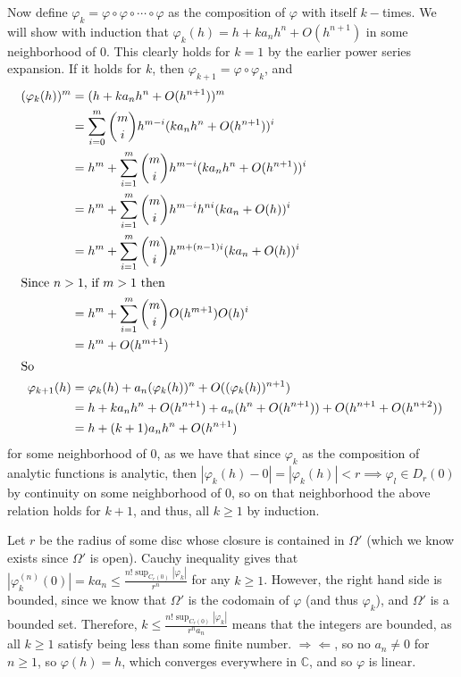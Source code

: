 \documentclass[12pt,letterpaper]{article}
\theoremstyle{definition}
\newcommand{\contra}{\Rightarrow\!\Leftarrow}
\newcommand{\C}{\mathbb{C}}
\begin{document}
Now define $\varphi_{k} = \varphi \circ \varphi \circ \cdots \circ \varphi$ as the composition of $\varphi$ with itself $k-$times. We will show with induction that $\varphi_{k}(h) = h + ka_{n}h^{n} + O(h^{n+1})$ in some neighborhood of $0$. This clearly holds for $k = 1$ by the earlier power series expansion. If it holds for $k$, then $\varphi_{k+1} = \varphi \circ \varphi_{k}$, and
\begin{align*}
  (\varphi_{k}(h))^{m} &= (h + ka_nh^n+O(h^{n+1}))^m \\
                   &= \sum_{i=0}^{m}\binom{m}{i}h^{m-i}(ka_{n}h^{n} + O(h^{n+1}))^{i} \\
                   &= h^{m} + \sum_{i=1}^{m}\binom{m}{i}h^{m-i}(ka_{n}h^{n} + O(h^{n+1}))^{i} \\
                   &= h^{m} + \sum_{i=1}^{m}\binom{m}{i}h^{m-i}h^{ni}(ka_{n}+ O(h))^{i} \\
                   &= h^{m} + \sum_{i=1}^{m}\binom{m}{i}h^{m + (n-1)i}(ka_{n}+ O(h))^{i} \\
  \intertext{Since $n > 1$, if $m > 1$ then}
                   &= h^{m} + \sum_{i=1}^{m}\binom{m}{i}O(h^{m + 1})O(h)^{i} \\
                   &= h^{m} + O(h^{m+1}) \\
  \intertext{So}
  \varphi_{k+1}(h) &= \varphi_{k}(h) + a_{n}(\varphi_{k}(h))^{n} + O((\varphi_{k}(h))^{n+1}) \\
              &= h + ka_{n}h^{n} + O(h^{n+1}) + a_{n}(h^{n} + O(h^{n+1})) + O(h^{n+1} + O(h^{n+2})) \\
              &= h + (k+1)a_{n}h^{n} + O(h^{n+1})
\end{align*}
for some neighborhood of $0$, as we have that since $\varphi_{k}$ as the composition of analytic functions is analytic, then $|\varphi_{k}(h) - 0|  = |\varphi_{k}(h)| < r \implies \varphi_{l} \in D_{r}(0)$ by continuity on some neighborhood of 0, so on that neighborhood the above relation holds for $k + 1$, and thus, all $k \geq 1$ by induction.

Let $r$ be the radius of some disc whose closure is contained in $\Omega'$ (which we know exists since $\Omega'$ is open). Cauchy inequality gives that $|\varphi_{k}^{(n)}(0)| = ka_{n} \leq \frac{n!\sup_{C_{r}(0)}|\varphi_{k}|}{r^{n}}$ for any $k \geq 1$. However, the right hand side is bounded, since we know that $\Omega'$ is the codomain of $\varphi$ (and thus $\varphi_{k}$), and $\Omega'$ is a bounded set. Therefore, $k \leq \frac{n!\sup_{C_{r}(0)}|\varphi_{k}|}{r^{n}a_{n}}$ means that the integers are bounded, as all $k \geq 1$ satisfy being less than some finite number. $\contra$, so no $a_{n} \neq 0$ for $n \geq 1$, so $\varphi(h) = h$, which converges everywhere in $\C$, and so $\varphi$ is linear.
\end{document}
